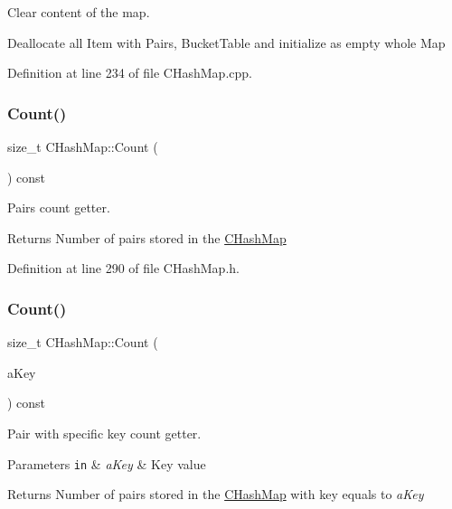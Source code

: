 Clear content of the map. 

Deallocate all Item with Pairs, Bucket\+Table and initialize as empty whole Map 

Definition at line 234 of file C\+Hash\+Map.\+cpp.

\mbox{\label{class_c_hash_map_a331800dc9d92d201377132fe62c9c9cf}} 
\subsubsection{\texorpdfstring{Count()}{Count()}\hspace{0.1cm}{\footnotesize\ttfamily [1/3]}}
{\footnotesize\ttfamily size\+\_\+t C\+Hash\+Map\+::\+Count (\begin{DoxyParamCaption}{ }\end{DoxyParamCaption}) const\hspace{0.3cm}{\ttfamily [inline]}}



Pairs count getter. 

\begin{DoxyReturn}{Returns}
Number of pairs stored in the \hyperlink{class_c_hash_map}{C\+Hash\+Map} 
\end{DoxyReturn}


Definition at line 290 of file C\+Hash\+Map.\+h.

\mbox{\label{class_c_hash_map_a00fac949f93212d8aef15740308b59e1}} 
\subsubsection{\texorpdfstring{Count()}{Count()}\hspace{0.1cm}{\footnotesize\ttfamily [2/3]}}
{\footnotesize\ttfamily size\+\_\+t C\+Hash\+Map\+::\+Count (\begin{DoxyParamCaption}\item[{const \hyperlink{class_c_pair_a9030f3ef2a07301c105bdf17620ae66a}{C\+Pair\+::\+T\+Key} \&}]{a\+Key }\end{DoxyParamCaption}) const}



Pair with specific key count getter. 


\begin{DoxyParams}[1]{Parameters}
\mbox{\tt in}  & {\em a\+Key} & Key value \\
\hline
\end{DoxyParams}
\begin{DoxyReturn}{Returns}
Number of pairs stored in the \hyperlink{class_c_hash_map}{C\+Hash\+Map} with key equals to {\itshape a\+Key} 
\end{DoxyReturn}


